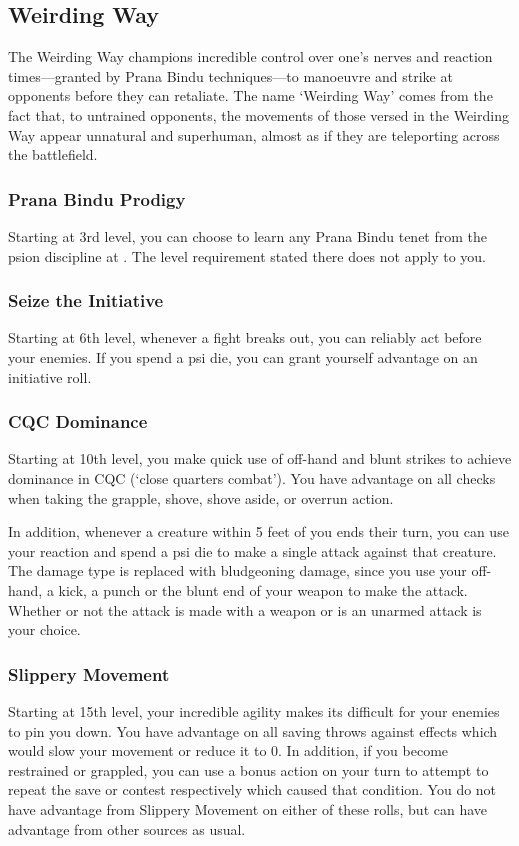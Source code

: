 \subsection{Weirding Way}
The Weirding Way champions incredible control over one's nerves
and reaction times---granted by Prana Bindu techniques---to
manoeuvre and strike at opponents before they can retaliate.
The name `Weirding Way' comes from the fact that,
to untrained opponents, the movements of those versed in
the Weirding Way appear unnatural and superhuman,
almost as if they are teleporting across the battlefield.

\subsubsection{Prana Bindu Prodigy}
Starting at 3rd level,
you can choose to learn any Prana Bindu tenet from
the psion discipline at .
The level requirement stated there does not apply to you.

\subsubsection{Seize the Initiative}
Starting at 6th level,
whenever a fight breaks out,
you can reliably act before your enemies.
If you spend a psi die,
you can grant yourself advantage on an initiative roll.

\subsubsection{CQC Dominance}
Starting at 10th level,
you make quick use of off-hand and blunt strikes to
achieve dominance in CQC (`close quarters combat').
You have advantage on all checks when taking the
grapple, shove, shove aside, or overrun action.

In addition,
whenever a creature within 5 feet of you ends their turn,
you can use your reaction and spend a psi die
to make a single attack against that creature.
The damage type is replaced with bludgeoning damage,
since you use your off-hand,
a kick, a punch or the blunt end of your weapon
to make the attack.
Whether or not the attack is made with a weapon
or is an unarmed attack is your choice.

\subsubsection{Slippery Movement}
Starting at 15th level,
your incredible agility makes its difficult for your
enemies to pin you down.
You have advantage on all saving throws against effects
which would slow your movement or reduce it to 0.
In addition,
if you become restrained or grappled,
you can use a bonus action on your turn
to attempt to repeat the save
or contest respectively which caused that condition.
You do not have advantage from Slippery Movement
on either of these rolls,
but can have advantage from other sources as usual.

